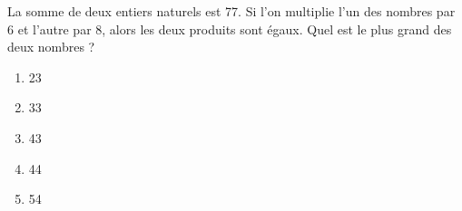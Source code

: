 La somme de deux entiers naturels est 77. Si l'on multiplie l'un des nombres par 6 et l'autre par 8, alors les deux produits sont égaux. Quel est le plus grand des deux nombres ?
\begin{multicols}{5}
  \begin{enumerate}[A/]
  \item 23
  \item 33
  \item 43
  \item 44
  \item 54
  \end{enumerate}
\end{multicols}